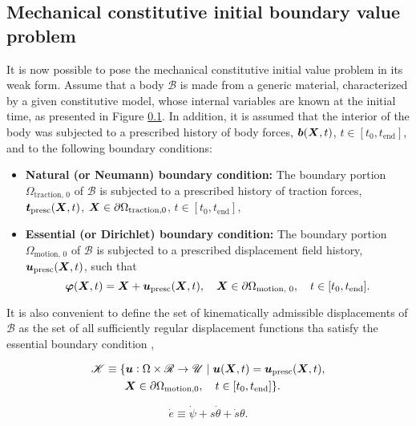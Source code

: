 \subsection{Mechanical constitutive initial boundary value problem}

It is now possible to pose the mechanical constitutive initial value problem in its weak form.
Assume that a body $\mathscr{B}$ is made from a generic material, characterized by a given constitutive model, whose internal variables are known at the initial time, as presented in Figure \ref{}.
In addition, it is assumed that the interior of the body was subjected to a prescribed history of body forces, $\bm{b}(\bm X, t)$, $t\in[t_0, t_\text{end}]$, and to the following boundary conditions:
\begin{itemize}
    \item \textbf{Natural (or Neumann) boundary condition:}
    The boundary portion $\Omega_\text{traction, 0}$ of $\mathscr{B}$ is subjected to a prescribed history of traction forces, $\bm{t}_\text{presc}(\bm{X}, t)$, $\bm{X}\in \partial \Omega_\text{traction,0}$, $t\in[t_0, t_\text{end}]$,\\
    \item \textbf{Essential (or Dirichlet) boundary condition:}
    The boundary portion $\Omega_\text{motion, 0}$ of $\mathscr{B}$ is subjected to a prescribed displacement field history, $\bm{u}_\text{presc}(\bm{X}, t)$, such that $$\bm{\varphi}(\bm{X}, t) = \bm{X} + \bm{u}_\text{presc}(\bm{X}, t),\quad \bm{X}\in \partial\Omega_\text{motion, 0},\quad t\in[t_0, t_\text{end}].$$
\end{itemize}

It is also convenient to define the set of kinematically admissible displacements of $\mathscr{B}$ as the set of all sufficiently regular displacement functions tha satisfy the essential boundary condition \citep{de2011computational},
\begin{highlight}[innertopmargin=-5pt]
    \begin{multline}
        \mathscr{K}\equiv \{\bm{u}:\Omega\times \mathscr{R}\to \mathscr{U}\;|\;\bm{u}(\bm{X},t) = \bm{u}_\text{presc} (\bm{X},t),\\ \bm{X}\in\partial \Omega_\text{motion,0},\quad t\in [t_0,t_\text{end}]\}.\quad
    \end{multline}
\end{highlight}


\begin{equation}
  \dot e \equiv \dot \psi + s\dot \theta + \dot s\theta.
\end{equation}

